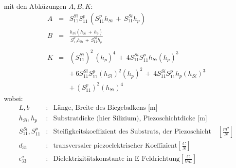 %
mit den Abküzungen $ A, B, K $:
%
\begin{eqnarray*}
   A & = & S^{Si}_{11} S^{p}_{11} \, \left( S^{p}_{11} h_{Si} \, + \,
           S^{Si}_{11} h_{p} \right ) \\
   B & = & \frac{h_{Si} (h_{Si} \, + \, h_{p}) }{ S^{p}_{11} h_{Si} \,
               +  \, S^{Si}_{11} h_{p}} \\
     &   &   \nonumber  \\
   K & = & (S^{Si}_{11})^{2} \, (h_{p})^{4} \, + \, 4S^{Si}_{11}
                   S^{p}_{11} h_{Si}(h_{p})^{3} \nonumber \\
     &   & + \, 6S^{Si}_{11} S^{p}_{11}(h_{Si})^{2}(h_{p})^{2} \, + \,
                4S^{Si}_{11} S^{p}_{11} h_{p} (h_{Si})^{3} \nonumber \\
     &   & + \, (S^{p}_{11})^{2}(h_{Si})^{4}
 \end{eqnarray*}
%
wobei:
\begin{eqnarray*}
 L, b                      & : &
  \mbox{Länge, Breite des Biegebalkens [m]} \\
 h_{Si},h_{p}              & : &
  \mbox{Substratdicke (hier Silizium), Piezoschichtdicke [m]}   \\
 S^{Si}_{11}, S^{p}_{11}   & : &
  \mbox{Steifigkeitskoeffizient des Substrats, der Piezoschicht}
  \quad \left [ \frac{m^{2}}{N} \right ] \\
 d_{31} & : & \mbox{transversaler piezoelektrischer Koeffizient}
  \left [ \frac{C}{N} \right ] \\
 \epsilon^{\sigma}_{33}    & : &
  \mbox{Dielektrizitätskonstante in E-Feldrichtung}
  \left [ \frac{C}{Vm}\right ]
\end{eqnarray*}

